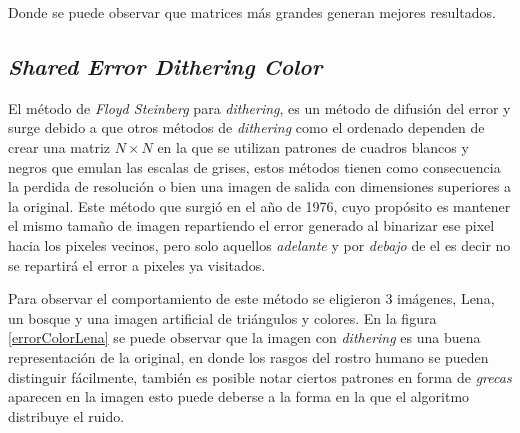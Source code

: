 \documentclass[conference]{IEEEtran}
\begin{document}
Donde se puede observar que matrices más grandes generan mejores resultados.

\subsection{\textit{Shared Error Dithering Color}}
El método de \textit{Floyd Steinberg} para \textit{dithering}, es un método de difusión del error
y surge debido a que otros métodos de \textit{dithering} como el ordenado dependen de crear 
una matriz $N\times N$ en la que se utilizan patrones de cuadros blancos y negros que 
emulan las escalas de grises, estos métodos tienen como consecuencia la perdida 
de resolución o bien una imagen de salida con dimensiones superiores a la original.
Este método que surgió en el año de 1976, cuyo propósito es mantener el mismo tamaño de imagen repartiendo el error generado al binarizar ese pixel hacia los pixeles vecinos, pero solo aquellos
\textit{adelante} y por \textit{debajo} de el es decir no se repartirá el error a pixeles ya visitados.


Para observar el comportamiento de este método se eligieron 3 imágenes, Lena, un bosque y
una imagen artificial de triángulos y colores. En la figura \ref{errorColorLena}
se puede observar que la imagen con \textit{dithering} es una buena representación de la original, en donde  los rasgos del rostro humano se pueden distinguir fácilmente, también es posible notar ciertos patrones en forma de \textit{grecas} aparecen en la imagen esto puede deberse a la forma en la que el algoritmo distribuye el ruido.


\end{document}
